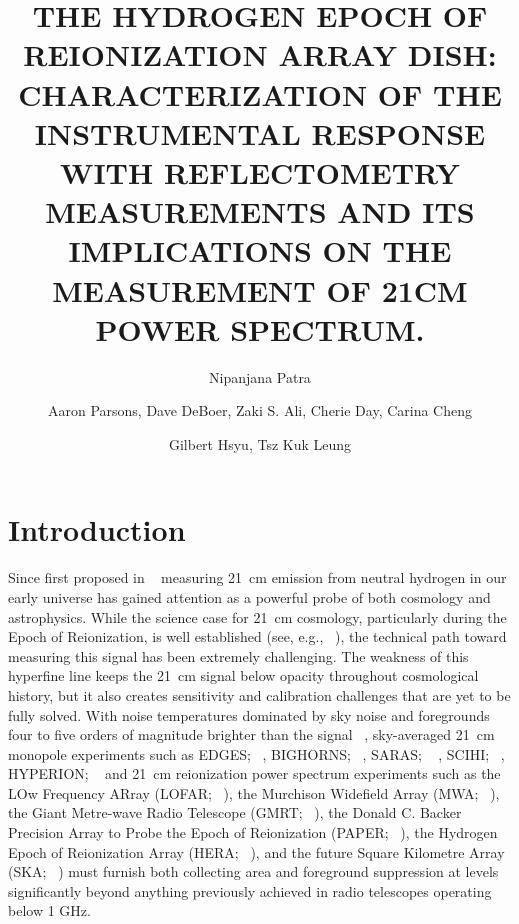 \documentclass[twocolumn]{emulateapj}
\begin{document}
\title{THE HYDROGEN EPOCH OF REIONIZATION ARRAY DISH: CHARACTERIZATION OF  THE INSTRUMENTAL RESPONSE WITH REFLECTOMETRY MEASUREMENTS AND ITS IMPLICATIONS ON THE MEASUREMENT OF 21CM POWER SPECTRUM. } 

\author{Nipanjana Patra }
\author{Aaron Parsons, Dave DeBoer, Zaki S. Ali, Cherie Day, Carina Cheng}
\author{Gilbert Hsyu, Tsz Kuk Leung}

\begin{abstract}
\end{abstract}


\section{\textbf{Introduction}}

Since first proposed in ~\citep{Shaver_et_al1999} measuring 21~cm
emission from neutral hydrogen in our early universe has gained attention as a
powerful probe of both cosmology and astrophysics.  While the science case for
21~cm cosmology, particularly during the Epoch of Reionization, is well
established (see, e.g.,
~\cite{furlanetto_et_al2006, morales_wyithe2010, pritchard_loeb2012}),
the technical path toward measuring this signal has been extremely challenging.  The
weakness of this hyperfine line keeps the 21~cm signal below opacity throughout
cosmological history, but it also creates sensitivity and calibration
challenges that are yet to be fully solved.  With noise temperatures dominated
by sky noise and foregrounds four to five orders of magnitude
brighter than the signal ~\citep{2015ApJ...801..138P}, 
sky-averaged 21~cm monopole experiments such as
EDGES; ~\citep{Bowman_et_al2010},
BIGHORNS; ~\citealt{XXX},
SARAS; ~\citep{Patra_et_al2015} ,
SCIHI; ~\citep{2015PhDT........65V},
HYPERION; ~\citep{presley_et_al2015}
and 21~cm reionization power spectrum experiments such as
the LOw Frequency ARray (LOFAR; ~\citealt{XXX}),
the Murchison Widefield Array (MWA; ~\citealt{XXX}),
the Giant Metre-wave Radio Telescope (GMRT; ~\citealt{XXX}),
the Donald C. Backer Precision Array to Probe the Epoch of Reionization (PAPER; ~\citealt{parsons_et_al2010}),
the Hydrogen Epoch of Reionization Array (HERA; ~\citealt{XXX}),
and the future Square Kilometre Array (SKA; ~\citealt{XXX})
must
furnish both collecting area and foreground suppression at levels significantly
beyond anything previously achieved in radio telescopes operating below 1 GHz.
\end{document}
